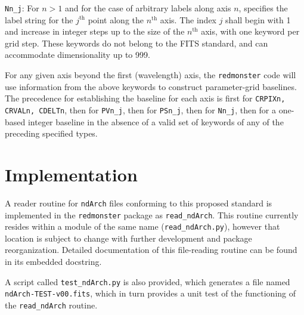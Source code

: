 \documentclass[12pt]{article}
\begin{document}
\noindent \texttt{Nn\_j}: For $n > 1$ and for the case of arbitrary labels
along axis $n$, specifies the label string for the $j^{\mathrm{th}}$
point along the $n^{\mathrm{th}}$ axis.
The index $j$ shall begin with 1 and increase in integer steps up to the
size of the $n^{\mathrm{th}}$ axis, with one keyword per grid step.
These keywords do not belong to the FITS standard,
and can accommodate dimensionality up to 999.

For any given axis beyond the first (wavelength) axis, the
\texttt{redmonster} code will use information from the above keywords
to construct parameter-grid baselines.  The precedence
for establishing the baseline for each axis is
first for \texttt{CRPIXn, CRVALn, CDELTn}, then for
\texttt{PVn\_j}, then for \texttt{PSn\_j}, then
for \texttt{Nn\_j}, then for a one-based integer baseline
in the absence of a valid set of keywords of any of the preceding
specified types.

\section{Implementation}

A reader routine for \texttt{ndArch} files conforming
to this proposed standard is implemented in the \texttt{redmonster}
package as \texttt{read\_ndArch}.  This routine currently resides
within a module of the same name (\texttt{read\_ndArch.py}),
however that location is
subject to change with further development and package
reorganization.  Detailed documentation of this file-reading
routine can be found in its embedded docstring.

A script called \texttt{test\_ndArch.py} is also provided,
which generates a file named \texttt{ndArch-TEST-v00.fits},
which in turn provides a unit test of the functioning of
the \texttt{read\_ndArch} routine.
\end{document}
